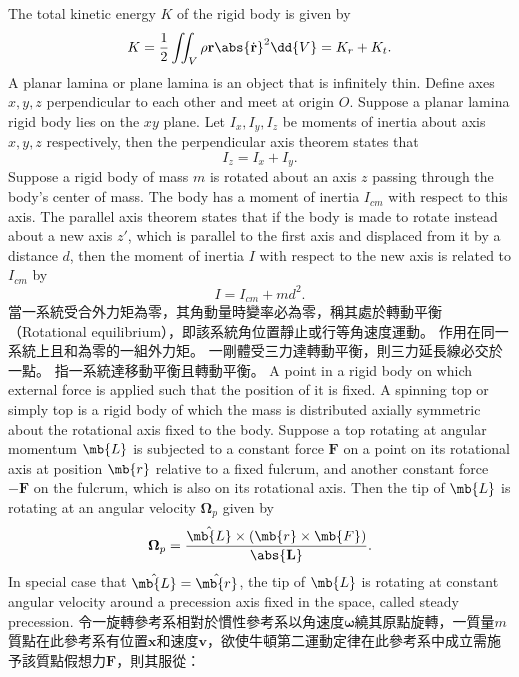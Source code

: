 \documentclass[a4paper,12pt]{article}
\begin{document}
The total kinetic energy $K$ of the rigid body is given by
\[K=\frac{1}{2}\iint_V\rho{\mathbf{r}}\abs{\dot{\mathbf{r}}}^2\dd{V}=K_r+K_t.\]
A planar lamina or plane lamina is an object that is infinitely thin.
Define axes $x,y,z$ perpendicular to each other and meet at origin $O$. Suppose a planar lamina rigid body lies on the $xy$ plane. Let $I_x,I_y,I_z$ be moments of inertia about axis $x,y,z$ respectively, then the perpendicular axis theorem states that
\[I_z=I_x+I_y.\]
Suppose a rigid body of mass $m$ is rotated about an axis $z$ passing through the body's center of mass. The body has a moment of inertia $I_{cm}$ with respect to this axis. The parallel axis theorem states that if the body is made to rotate instead about a new axis $z'$, which is parallel to the first axis and displaced from it by a distance $d$, then the moment of inertia $I$ with respect to the new axis is related to $I_{cm}$ by
\[I=I_{cm}+md^2.\]
當一系統受合外力矩為零，其角動量時變率必為零，稱其處於轉動平衡（Rotational equilibrium），即該系統角位置靜止或行等角速度運動。
作用在同一系統上且和為零的一組外力矩。
一剛體受三力達轉動平衡，則三力延長線必交於一點。
指一系統達移動平衡且轉動平衡。
A point in a rigid body on which external force is applied such that the position of it is fixed.
A spinning top or simply top is a rigid body of which the mass is distributed axially symmetric about the rotational axis fixed to the body.
Suppose a top rotating at angular momentum $\mb{L}$ is subjected to a constant force $\mathbf{F}$ on a point on its rotational axis at position $\mb{r}$ relative to a fixed fulcrum, and another constant force $-\mathbf{F}$ on the fulcrum, which is also on its rotational axis. Then the tip of $\mb{L}$ is rotating at an angular velocity $\boldsymbol{\Omega}_p$ given by
\[\boldsymbol{\Omega}_p=
\frac{\hat{\mb{L}}\times(\mb{r}\times\mb{F})}{\abs{\mathbf{L}}}.\]
In special case that $\hat{\mb{L}}=\hat{\mb{r}}$, the tip of $\mb{L}$ is rotating at constant angular velocity around a precession axis fixed in the space, called steady precession.
令一旋轉參考系相對於慣性參考系以角速度$\boldsymbol{\omega}$繞其原點旋轉，一質量$m$質點在此參考系有位置$\mathbf{x}$和速度$\mathbf{v}$，欲使牛頓第二運動定律在此參考系中成立需施予該質點假想力$\mathbf{F}$，則其服從：
\end{document}

